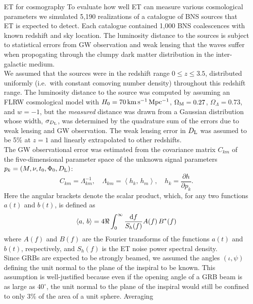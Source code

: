 %
{ET for cosmography}
{
To evaluate how well  ET can measure various cosmological 
parameters we simulated 5,190 realizations
of a catalogue of BNS sources that ET is expected to detect. 
Each catalogue contained 1,000 BNS coalescences
with known redshift and sky location. The luminosity
distance to the sources is subject to statistical errors 
from GW observation and weak lensing that the waves suffer
when propogating through the clumpy dark matter distribution
in the inter-galactic medium.
\\[5pt]
We assumed that the sources were in the redshift range 
$0\le z \le 3.5$, distributed uniformly (i.e.\  with constant 
comoving number density) throughout this redshift range. The 
luminosity distance to the source was computed by assuming an 
FLRW cosmological model with $H_0=70\,{\rm km\,s^{-1}\,Mpc^{-1}}$,
$\Omega_{\rm M}=0.27$, $\Omega_\Lambda=0.73$, and $w=-1$, 
but the \emph{measured} distance was drawn from a Gaussian 
distribution whose width, $\sigma_{D_{\rm L}}$, was determined 
by the quadrature sum of the errors due to weak lensing
and GW observation. The weak lensing error in $D_{\rm L}$
was assumed to be 5\% at $z=1$ and linearly extrapolated to 
other redshifts.  
\\[5pt]
The GW observational error was estimated from the covariance matrix 
$C_{km}$ of the five-dimensional parameter space of the unknown signal
parameters $p_k = (M,\nu,t_0,\Phi_0, D_{\rm L})$:
\begin{equation}
C_{km} = \Lambda_{km}^{-1},\quad \Lambda_{km} = \left < h_k,\, h_m \right >,
\quad h_k = \frac{\partial h}{\partial p_k}.
\end{equation}
Here the angular brackets denote the scalar product, which,
for any two functions $a(t)$ and $b(t)$, is defined as
\begin{equation}
\left < a,\, b \right > = 4 \Re \int_0^\infty \frac{{\rm d}f}{S_h(f)}
A(f)\,B^*(f)
\end{equation}
where $A(f)$ and $B(f)$ are the Fourier transforms of the
functions $a(t)$ and $b(t)$, respectively, and $S_h(f)$ is the ET
noise power spectral density.  
\\[5pt]
Since GRBs are expected to be strongly beamed, we assumed the 
angles $(\iota,\psi)$ defining the unit normal to the plane 
of the inspiral to be known. This assumption is well-justified 
because even if the opening angle of a GRB beam is as large as 
$40^\circ$, the unit normal to the plane of the inspiral would still 
be confined to only 3\% of the area of a unit sphere. Averaging 
}
